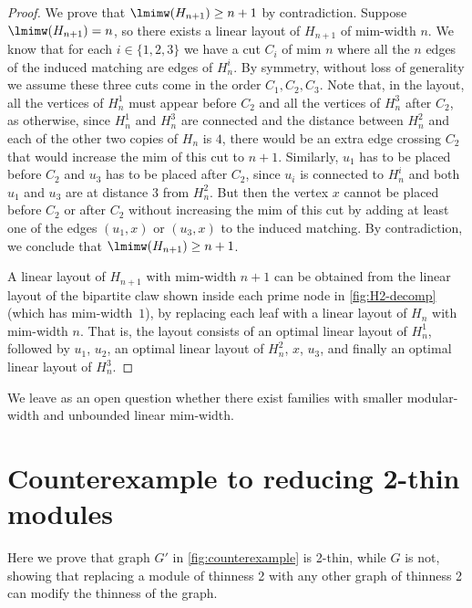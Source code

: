 \documentclass[11pt]{article}
\theoremstyle{plain}
\theoremstyle{definition}
\theoremstyle{remark}
\begin{document}
\begin{appendices}
\begin{proof}
We prove that $\lmimw(H_{n+1}) \geq n+1$ by contradiction. Suppose $\lmimw(H_{n+1}) = n$, so there exists a linear layout of $H_{n+1}$ of mim-width $n$. We know that for each $i \in \{1,2,3\}$ we have a cut $C_i$ of mim $n$ where all the $n$ edges of the induced matching are edges of $H_n^i$. By symmetry, without loss of generality we assume these three cuts come in the order $C_1,C_2,C_3$. Note that, in the layout, all the vertices of $H_n^1$ must appear before $C_2$ and all the vertices of $H_n^3$ after $C_2$, as otherwise, since $H_n^1$ and $H_n^3$ are connected and the distance between $H_n^2$ and each of the other two copies of $H_n$ is $4$, there would be an extra edge crossing $C_2$ that would increase the mim of this cut to $n + 1$. Similarly, $u_1$ has to be placed before $C_2$ and $u_3$ has to be placed after $C_2$, since $u_i$ is connected to $H_n^i$ and both $u_1$ and $u_3$ are at distance $3$ from $H_n^2$. But then the vertex $x$ cannot be placed before $C_2$ or after $C_2$ without increasing the mim of this cut by adding at least one of the edges $(u_1,x)$ or $(u_3,x)$ to the induced matching. By contradiction, we conclude that $\lmimw(H_{n+1}) \geq n+1$.

A linear layout of $H_{n+1}$ with mim-width $n+1$ can be obtained from the linear layout of the bipartite claw shown inside each prime node in \autoref{fig:H2-decomp} (which has mim-width~$1$), by replacing each leaf with a linear layout of $H_{n}$ with mim-width $n$. That is, the layout consists of an optimal linear layout of $H_n^1$, followed by $u_1$, $u_2$, an optimal linear layout of $H_n^2$, $x$, $u_3$, and finally an optimal linear layout of $H_n^3$.
\end{proof}

We leave as an open question whether there exist families with smaller modular-width and unbounded linear mim-width.

\section{Counterexample to reducing 2-thin modules}
\label{sec:counterexample}

Here we prove that graph $G'$ in \cref{fig:counterexample} is 2-thin, while $G$ is not, showing that replacing a module of thinness 2 with any other graph of thinness 2 can modify the thinness of the graph.


\end{appendices}
\end{document}
